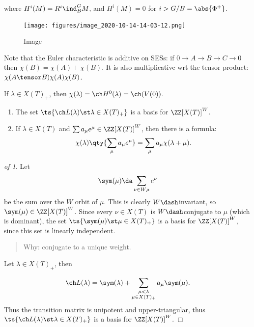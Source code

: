 where \(H^i(M) = R^i \ind_B^G M\), and \(H^i(M) =0\) for
\(i> G/B = \abs{\Phi^+}\).

\begin{figure}
\centering
\texttt{[image: figures/image\_2020-10-14-14-03-12.png]}
\caption{Image}
\end{figure}

Note that the Euler characteristic is additive on SESs: if
\(0\to A\to B\to C\to 0\) then \(\chi(B) = \chi(A) + \chi(B)\). It is
also multiplicative wrt the tensor product:
\(\chi(A\tensor B) \chi(A) \chi(B)\).


\begin{remark}

If \(\lambda \in X(T)_+\), then
\(\chi(\lambda) = \ch H^0(\lambda) = \ch(V(0))\).

\end{remark}

\begin{proposition}[?]

\hfill

\begin{enumerate}
\def\labelenumi{\arabic{enumi}.}
\item
  The set \(\ts{\ch L(\lambda) \st \lambda\in X(T)_+}\) is a basis for
  \(\ZZ[X(T)]^W\).
\item
  If \(\lambda \in X(T)\) and \(\sum a_\mu e^\mu \in \ZZ[X(T)]^W\), then
  there is a formula:
  \begin{align*}  
  \chi(\lambda) \qty{ \sum_\mu a_\mu e^\mu } = \sum_\mu a_\mu \chi(\lambda + \mu)
  .\end{align*}
\end{enumerate}

\end{proposition}

\begin{proof}[of 1]

Let
\begin{align*}
\sym(\mu) \da \sum_{\nu \in W\mu} e^\nu
\end{align*} be the sum over the \(W\) orbit of \(\mu\). This is clearly
\(W\dash\)invariant, so \(\sym(\mu) \in \ZZ[X(T)]^W\). Since every
\(\nu \in X(T)\) is \(W\dash\)conjugate to \(\mu\) (which is dominant),
the set \(\ts{\sym(\mu) \st \mu \in X(T)_+}\) is a basis for
\(\ZZ[X(T)]^W\), since this set is linearly independent.

\begin{quote}
Why: conjugate to a unique weight.
\end{quote}

Let \(\lambda \in X(T)_+\), then

\begin{align*}
\ch L(\lambda) = \sym(\lambda) + \sum_{\substack{\mu < \lambda \\ \mu \in X(T)_+} } a_\mu \sym(\mu)
.\end{align*} Thus the transition matrix is unipotent and
upper-triangular, thus \(\ts{\ch L(\lambda) \st \lambda \in X(T)_+}\) is
a basis for \(\ZZ[X(T)]^W\).

\end{proof}

